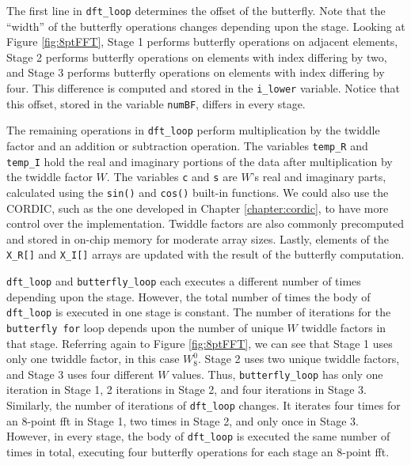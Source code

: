 The first line in \lstinline|dft_loop| determines the offset of the butterfly. Note that the ``width'' of the butterfly operations changes depending upon the stage. Looking at Figure \ref{fig:8ptFFT}, Stage 1 performs butterfly operations on adjacent elements, Stage 2 performs butterfly operations on elements with index differing by two, and Stage 3 performs butterfly operations on elements with index differing by four. This difference is computed and stored in the \lstinline|i_lower| variable. Notice that this offset, stored in the variable \lstinline|numBF|, differs in every stage. 

The remaining operations in \lstinline|dft_loop| perform multiplication by the twiddle factor and an addition or subtraction operation. The variables \lstinline|temp_R| and \lstinline|temp_I| hold the real and imaginary portions of the data after multiplication by the twiddle factor $W$. The variables \lstinline|c| and \lstinline|s| are $ W$'s real and imaginary parts, calculated using the \lstinline|sin()| and \lstinline|cos()| built-in functions. We could also use the CORDIC, such as the one developed in Chapter \ref{chapter:cordic}, to have more control over the implementation. Twiddle factors are also commonly precomputed and stored in on-chip memory for moderate array sizes.  Lastly, elements of the \lstinline|X_R[]| and \lstinline|X_I[]| arrays are updated with the result of the butterfly computation.

\lstinline|dft_loop| and \lstinline|butterfly_loop| each executes a different number of times depending upon the stage. However, the total number of times the body of \lstinline|dft_loop| is executed in one stage is constant. The number of iterations for the \lstinline|butterfly for| loop depends upon the number of unique $W$ twiddle factors in that stage. Referring again to Figure \ref{fig:8ptFFT}, we can see that Stage 1 uses only one twiddle factor, in this case $W_8^0$. Stage 2 uses two unique twiddle factors, and Stage 3 uses four different $W$ values. Thus, \lstinline|butterfly_loop| has only one iteration in Stage 1, 2 iterations in Stage 2, and four iterations in Stage 3. Similarly, the number of iterations of \lstinline|dft_loop| changes. It iterates four times for an 8-point \gls{fft} in Stage 1, two times in Stage 2, and only once in Stage 3. However, in every stage, the body of \lstinline|dft_loop| is executed the same number of times in total, executing four butterfly operations for each stage an 8-point \gls{fft}. 

